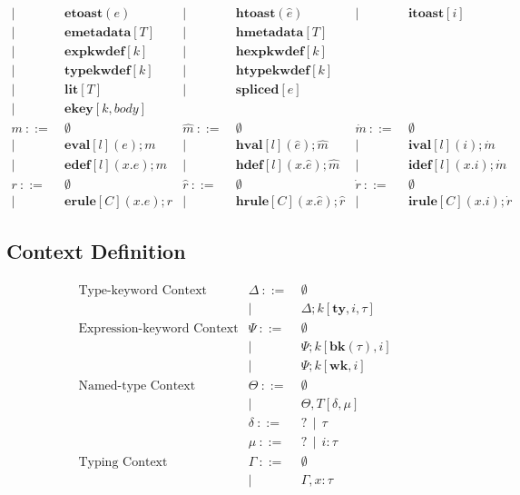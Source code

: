\documentclass[letterpaper, notitlepage]{article}
\begin{document}
\[\begin{array}{rlrlrl}
				| ~ &~ \mathbf{etoast}(e)     			& 		 	| ~ &~	\mathbf{htoast}(\hat{e})				& 		 	| ~ &~	\mathbf{itoast}[i]\\
				| ~ &~ \mathbf{emetadata}[T]     		& 		 	| ~ &~	\mathbf{hmetadata}[T]\\
				| ~ &~ \mathbf{expkwdef}[k]     		&			| ~ &~ 	\mathbf{hexpkwdef}[k]\\
				| ~ &~ \mathbf{typekwdef}[k]			& 			| ~ &~ 	\mathbf{htypekwdef}[k]\\
				| ~ &~ \mathbf{lit}[T]					& 		 	| ~ &~ 	\mathbf{spliced}[e]\\
				| ~ &~ \mathbf{ekey}[k,body]\\
	m 			~::=&~ \emptyset						&\hat{m}	~::=&~ \emptyset								&\dot{m}	~::=&~ \emptyset\\
				| ~ &~ \mathbf{eval}[l](e);m 			&			| ~ &~ \mathbf{hval}[l](\hat{e});\hat{m} 		&			| ~ &~ \mathbf{ival}[l](i);\dot{m}\\
				| ~ &~ \mathbf{edef}[l](x.e);m 			&			| ~ &~ \mathbf{hdef}[l](x.\hat{e});\hat{m}		&			| ~ &~ \mathbf{idef}[l](x.i);\dot{m}\\
	r 			~::=&~ \emptyset 						&\hat{r} 	~::=&~ \emptyset 								&\dot{r} 	~::=&~ \emptyset\\
				| ~ &~ \mathbf{erule}[C](x.e);r 		& 			| ~ &~ \mathbf{hrule}[C](x.\hat{e});\hat{r} 	&			| ~ &~ \mathbf{irule}[C](x.i);\dot{r}
\end{array}
\]
\subsection{Context Definition}
\[
\begin{array}{rrl}
\text{Type-keyword Context}			&	\Delta 			~::=&~ 	\emptyset\\
&					| ~ &~ 	\Delta;k[\mathbf{ty},i,\tau]\\
\text{Expression-keyword Context}			&	\Psi 			~::=&~	\emptyset\\
&					| ~ &~ 	\Psi;k[\mathbf{bk}(\tau),i]\\
&					| ~ &~ 	\Psi;k[\mathbf{wk},i]\\
\text{Named-type Context}&	\Theta 			~::=&~ \emptyset\\
&					| ~ &~ \Theta,T[\delta,\mu] \\
&	\delta 			~::=&~ ? ~~ | ~~ \tau\\
&	\mu	   			~::=&~ ? ~~ | ~~ i:\tau\\
\text{Typing Context}&	\Gamma 			~::=&~ \emptyset\\
&					| ~ &~ \Gamma,x:\tau\\
\end{array}
\]
\end{document}
